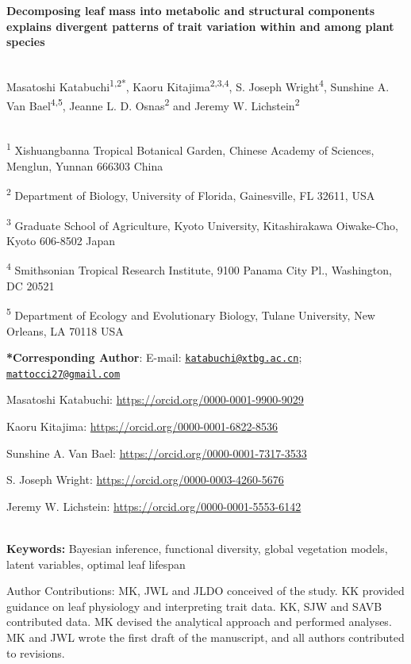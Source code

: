 \documentclass[
  12pt,
  letterpaper,
  DIV=11,
  numbers=noendperiod]{scrartcl}
\author{}
\date{}
\begin{document}
\textbf{Decomposing leaf mass into metabolic and structural components
explains divergent patterns of trait variation within and among plant
species}\\
\strut \\
Masatoshi Katabuchi\textsuperscript{1,2*}, Kaoru
Kitajima\textsuperscript{2,3,4}, S. Joseph Wright\textsuperscript{4},
Sunshine A. Van Bael\textsuperscript{4,5}, Jeanne L. D.
Osnas\textsuperscript{2} and Jeremy W. Lichstein\textsuperscript{2}\\
\strut \\
\textsuperscript{1} Xishuangbanna Tropical Botanical Garden, Chinese
Academy of Sciences, Menglun, Yunnan 666303 China

\textsuperscript{2} Department of Biology, University of Florida,
Gainesville, FL 32611, USA

\textsuperscript{3} Graduate School of Agriculture, Kyoto University,
Kitashirakawa Oiwake-Cho, Kyoto 606-8502 Japan

\textsuperscript{4} Smithsonian Tropical Research Institute, 9100 Panama
City Pl., Washington, DC 20521

\textsuperscript{5} Department of Ecology and Evolutionary Biology,
Tulane University, New Orleans, LA 70118 USA

\textbf{*Corresponding Author}: E-mail:
\href{mailto:katabuchi@xtbg.ac.cn}{\nolinkurl{katabuchi@xtbg.ac.cn}};
\href{mailto:mattocci27@gmail.com}{\nolinkurl{mattocci27@gmail.com}}

Masatoshi Katabuchi: \url{https://orcid.org/0000-0001-9900-9029}

Kaoru Kitajima: \url{https://orcid.org/0000-0001-6822-8536}

Sunshine A. Van Bael: \url{https://orcid.org/0000-0001-7317-3533}

S. Joseph Wright: \url{https://orcid.org/0000-0003-4260-5676}

Jeremy W. Lichstein: \url{https://orcid.org/0000-0001-5553-6142}\\
\strut \\
\textbf{Keywords:} Bayesian inference, functional diversity, global
vegetation models, latent variables, optimal leaf lifespan

Author Contributions: MK, JWL and JLDO conceived of the study. KK
provided guidance on leaf physiology and interpreting trait data. KK,
SJW and SAVB contributed data. MK devised the analytical approach and
performed analyses. MK and JWL wrote the first draft of the manuscript,
and all authors contributed to revisions.
\end{document}
